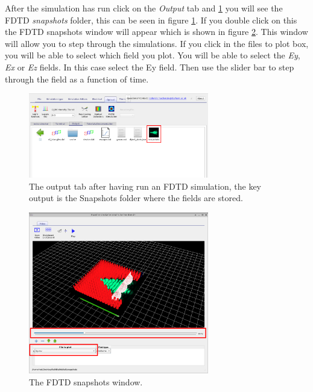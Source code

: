 After the simulation has run click on the \emph{Output} tab and \ref{fig:fdtdoutputs} you will see the FDTD \emph{snapshots} folder, this can be seen in figure \ref{fig:fdtdoutputs}.  If you double click on this the FDTD snapshots window will appear which is shown in figure \ref{fig:fdtdsnapshots}.  This window will allow you to step through the simulations. If you click in the files to plot box, you will be able to select which field you plot. You will be able to select the \emph{Ey}, \emph{Ex} or \emph{Ez} fields.  In this case select the Ey field. Then use the slider bar to step through the field as a function of time.

\begin{figure}[H]
\centering
\includegraphics[width=0.7\textwidth]{./images/fdtd_8.png}
\caption{The output tab after having run an FDTD simulation, the key output is the Snapshots folder where the fields are stored.}
\label{fig:fdtdoutputs}
\end{figure}

\begin{figure}[H]
\centering
\includegraphics[width=0.7\textwidth]{./images/fdtd_9.png}
\caption{The FDTD snapshots window.}
\label{fig:fdtdsnapshots}
\end{figure}

